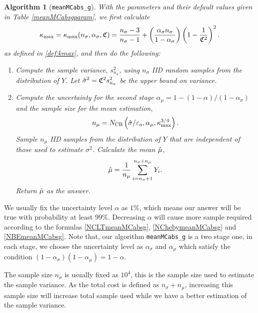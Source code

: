 \documentclass{iitthesis}
\newtheorem{algorithm}[theorem]{Algorithm}
\theoremstyle{definition}
\begin{document}
\begin{algorithm}[{\tt meanMCabs\_g}]
With the parameters and their default values given in Table \ref{meanMCabsgparam}, we first calculate 
\begin{equation}	\label{kmaxinalg}
\kappa_{\max}=\kappa_{\max}(n_\sigma,\alpha_\sigma,\mathfrak{C}) =\frac{n_\sigma-3}{n_\sigma-1} + \left(\frac{ \alpha_\sigma n_\sigma}{1-\alpha_\sigma}\right) \left(1 - \frac{1}{\mathfrak{C}^2}\right)^2.
\end{equation}
as defined in \eqref{def:kmax}, and then do the following:
\begin{enumerate}
\item Compute the sample variance, $s^2_{n_{\sigma}}$, using $n_\sigma$ IID random samples from the distribution of  $Y$. Let $\hat{\sigma}^2 = \mathfrak{C}^2 s^2_{n_\sigma}$ be the upper bound on variance.
\item Compute the uncertainty for the second stage $\alpha_\mu = 1-(1-\alpha)/(1-\alpha_{\sigma})$ and the sample size for the mean estimation,
\begin{align}\label{def:meanmcabsgnmu}
n_\mu = N_{\text{CB}} \left(\hat{\sigma}/\varepsilon_a,\alpha_\mu, \kappa_{\max}^{3/4}\right).
\end{align}
Sample $n_\mu$ IID samples from the distribution of $Y$ that are independent of those used to estimate $\sigma^2$. Calculate the mean $\hat{\mu}$,
\begin{align}\label{def:meanmcabsghmu}
\hat{\mu} = \frac{1}{n_\mu}\sum_{i = n_\sigma+1}^{n_\sigma+n_\mu}Y_i.
\end{align}
Return $\hat{\mu}$ as the answer.
\end{enumerate}

\end{algorithm}

\label{subsec:sensitivityofparameters}
 We usually fix the uncertainty level $\alpha$ as $1\%$, which means our answer will be true with probability at least $99\%$. Decreasing $\alpha$ will cause more sample required according to the formulas \eqref{NCLTmeanMCabsg}, \eqref{NChebymeanMCabsg} and \eqref{NBEmeanMCabsg}. Note that, our algorithm {\tt meanMCabs\_g} is a two stage one, in each stage, we choose the uncertainty level as $\alpha_\sigma$ and $\alpha_\mu$ which satisfy the condition $(1-\alpha_\sigma)(1-\alpha_\mu)=1-\alpha$.

The sample size $n_\sigma$ is usually fixed as $10^4$, this is the sample size used to estimate the sample variance. As the total cost is defined as $n_\sigma +n_\mu$, increasing this sample size will increase total sample used while we have a better estimation of the sample variance. 
\end{document}
